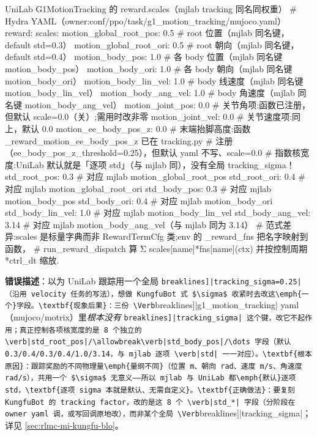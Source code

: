 \begin{codebox}[Python]{UniLab G1MotionTracking 的 reward.scales（mjlab tracking 同名同权重）}
# Hydra YAML（owner:conf/ppo/task/g1_motion_tracking/mujoco.yaml）
reward:
  scales:
    motion_global_root_pos: 0.5     # root 位置（mjlab 同名键，default std=0.3）
    motion_global_root_ori: 0.5     # root 朝向（mjlab 同名键，default std=0.4）
    motion_body_pos: 1.0            # 各 body 位置（mjlab 同名键 motion_body_pos）
    motion_body_ori: 1.0            # 各 body 朝向（mjlab 同名键 motion_body_ori）
    motion_body_lin_vel: 1.0        # body 线速度（mjlab 同名键 motion_body_lin_vel）
    motion_body_ang_vel: 1.0        # body 角速度（mjlab 同名键 motion_body_ang_vel）
    motion_joint_pos: 0.0           # 关节角项:函数已注册，但默认 scale=0.0（关）;需用时改非零
    motion_joint_vel: 0.0           # 关节速度项:同上，默认 0.0
    motion_ee_body_pos_z: 0.0       # 末端抬脚高度:函数 _reward_motion_ee_body_pos_z 已在 tracking.py
                                    # 注册（ee_body_pos_z_threshold=0.25），但默认 yaml 不写、scale=0.0
  # 指数核宽度:UniLab 默认就是「逐项 std」（与 mjlab 同），没有全局 tracking_sigma！
  std_root_pos:  0.3               # 对应 mjlab motion_global_root_pos
  std_root_ori:  0.4               # 对应 mjlab motion_global_root_ori
  std_body_pos:  0.3               # 对应 mjlab motion_body_pos
  std_body_ori:  0.4               # 对应 mjlab motion_body_ori
  std_body_lin_vel: 1.0            # 对应 mjlab motion_body_lin_vel
  std_body_ang_vel: 3.14           # 对应 mjlab motion_body_ang_vel（与 mjlab 同为 3.14）
# 范式差异:scales 是标量字典而非 RewardTermCfg 类;env 的 _reward_fns 把名字映射到函数，
# run_reward_dispatch 算 Σ scales[name]*fns[name](ctx) 并按控制周期 *ctrl_dt 缩放.
\end{codebox}

\begin{pitfall}
\textbf{错误描述}：以为 UniLab 跟踪用一个全局 \Verb[breaklines]|tracking_sigma=0.25|（沿用 velocity 任务的写法），想做 KungfuBot 式 $\sigma$ 收紧时去改这\emph{一个}字段。\textbf{现象后果}：三份 \Verb[breaklines]|g1_motion_tracking| yaml（mujoco/motrix）里\emph{根本没有} \Verb[breaklines]|tracking_sigma| 这个键，改它不起作用；真正控制各项核宽度的是 8 个独立的 \verb|std_root_pos|/\allowbreak\verb|std_body_pos|/\dots 字段（默认 0.3/0.4/0.3/0.4/1.0/3.14，与 mjlab 逐项 \verb|std| 一一对应）。\textbf{根本原因}：跟踪奖励的不同物理量\emph{量纲不同}（位置 m、朝向 rad、速度 m/s、角速度 rad/s），共用一个 $\sigma$ 无意义——所以 mjlab 与 UniLab 都\emph{默认}逐项 std，\textbf{逐项 sigma 本就是默认、无需自定义}。\textbf{正确做法}：要复刻 KungfuBot 的 tracking factor，改的是这 8 个 \verb|std_*| 字段（分阶段在 owner yaml 调，或写回调原地改），而非某个全局 \Verb[breaklines]|tracking_sigma|；详见 \cref{sec:rlmc-mi-kungfu-blo}。\end{pitfall}

